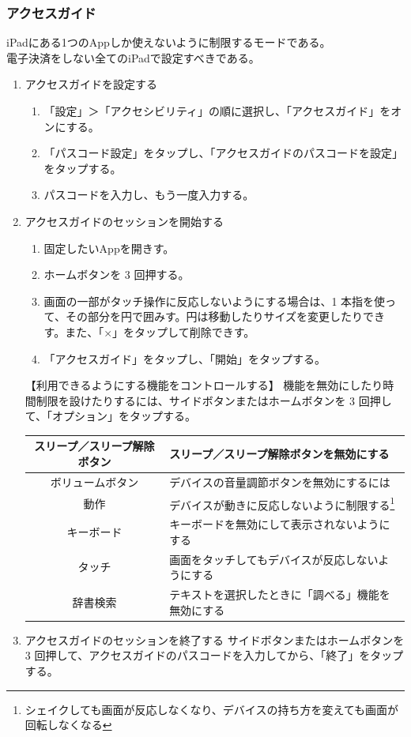 \documentclass[dvipdfmx,jb5]{jarticle}
\begin{document}
  \subsubsection{アクセスガイド}
  iPadにある1つのAppしか使えないように制限するモードである。\\
  電子決済をしない全てのiPadで設定すべきである。
  \begin{enumerate}
   \item アクセスガイドを設定する
   \begin{enumerate}[手順1.]
    \item 「設定」＞「アクセシビリティ」の順に選択し、「アクセスガイド」をオンにする。
    \item 「パスコード設定」をタップし、「アクセスガイドのパスコードを設定」をタップする。
    \item パスコードを入力し、もう一度入力する。
   \end{enumerate}
   \item アクセスガイドのセッションを開始する
   \begin{enumerate}[手順1.]
    \item 固定したいAppを開きす。
    \item ホームボタンを 3 回押する。
    \item 画面の一部がタッチ操作に反応しないようにする場合は、1 本指を使って、その部分を円で囲みす。円は移動したりサイズを変更したりできす。また、「$\times$」をタップして削除できす。
    \item 「アクセスガイド」をタップし、「開始」をタップする。
   \end{enumerate}
   \begin{itembox}[l]{【利用できるようにする機能をコントロールする】}
    機能を無効にしたり時間制限を設けたりするには、サイドボタンまたはホームボタンを 3 回押して、「オプション」をタップする。
    \begin{center}
    \begin{tabular}{|c|l|}\hline
     スリープ／スリープ解除ボタン&スリープ／スリープ解除ボタンを無効にする\\ \hline
     ボリュームボタン&デバイスの音量調節ボタンを無効にするには\\ \hline
     動作&デバイスが動きに反応しないように制限する\footnote{シェイクしても画面が反応しなくなり、デバイスの持ち方を変えても画面が回転しなくなる}\\ \hline
     キーボード&キーボードを無効にして表示されないようにする\\ \hline
     タッチ&画面をタッチしてもデバイスが反応しないようにする\\ \hline
     辞書検索&テキストを選択したときに「調べる」機能を無効にする\\ \hline
    \end{tabular}
    \end{center}
   \end{itembox}
   \item アクセスガイドのセッションを終了する
   サイドボタンまたはホームボタンを 3 回押して、アクセスガイドのパスコードを入力してから、「終了」をタップする。
  \end{enumerate}
\end{document}
